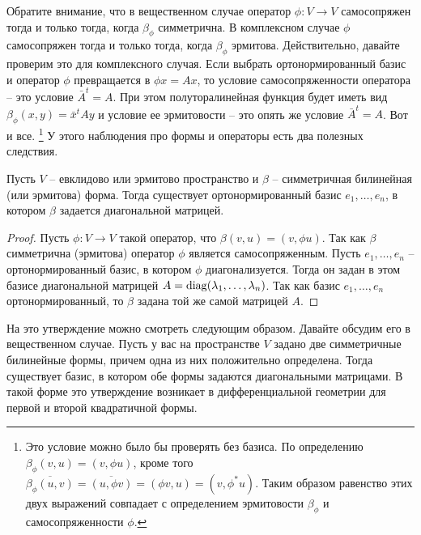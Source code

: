 Обратите внимание, что в вещественном случае оператор $\phi\colon V\to V$ самосопряжен тогда и только тогда, когда $\beta_\phi$ симметрична.
В комплексном случае $\phi$ самосопряжен тогда и только тогда, когда $\beta_\phi$ эрмитова.
Действительно, давайте проверим это для комплексного случая.
Если выбрать ортонормированный базис и оператор $\phi$ превращается в $\phi x = A x$, то условие самосопряженности оператора -- это условие $\bar A^t = A$.
При этом полуторалинейная функция будет иметь вид $\beta_\phi(x, y) = \bar x^t A y$ и условие ее эрмитовости -- это опять же условие $\bar A^t = A$.
Вот и все.%
\footnote{Это условие можно было бы проверять без базиса.
По определению $\beta_\phi(v, u) = (v, \phi u)$, кроме того $\overline{\beta_\phi(u, v)} = \overline{(u, \phi v)} = (\phi v, u) = (v, \phi^* u)$.
Таким образом равенство этих двух выражений совпадает с определением эрмитовости $\beta_\phi$ и самосопряженности $\phi$.}
У этого наблюдения про формы и операторы есть два полезных следствия.

\begin{claim}
\label{claim::BilinOrthoDiag}
Пусть $V$ -- евклидово или эрмитово пространство и $\beta$ -- симметричная билинейная (или эрмитова) форма.
Тогда существует ортонормированный базис $e_1,\ldots,e_n$, в котором $\beta$ задается диагональной матрицей.
\end{claim}
\begin{proof}
Пусть $\phi\colon V\to V$ такой оператор, что $\beta(v, u) = (v, \phi u)$.
Так как $\beta$ симметрична (эрмитова) оператор $\phi$ является самосопряженным.
Пусть $e_1,\ldots,e_n$ -- ортонормированный базис, в котором $\phi$ диагонализуется.
Тогда он задан в этом базисе диагональной матрицей $A = \operatorname{diag}(\lambda_1,\ldots,\lambda_n)$.
Так как базис $e_1,\ldots,e_n$ ортонормированный, то $\beta$ задана той же самой матрицей $A$.
\end{proof}

На это утверждение можно смотреть следующим образом.
Давайте обсудим его в вещественном случае.
Пусть у вас на пространстве $V$ задано две симметричные билинейные формы, причем одна из них положительно определена.
Тогда существует базис, в котором обе формы задаются диагональными матрицами.
В такой форме это утверждение возникает в дифференциальной геометрии для первой и второй квадратичной формы.

